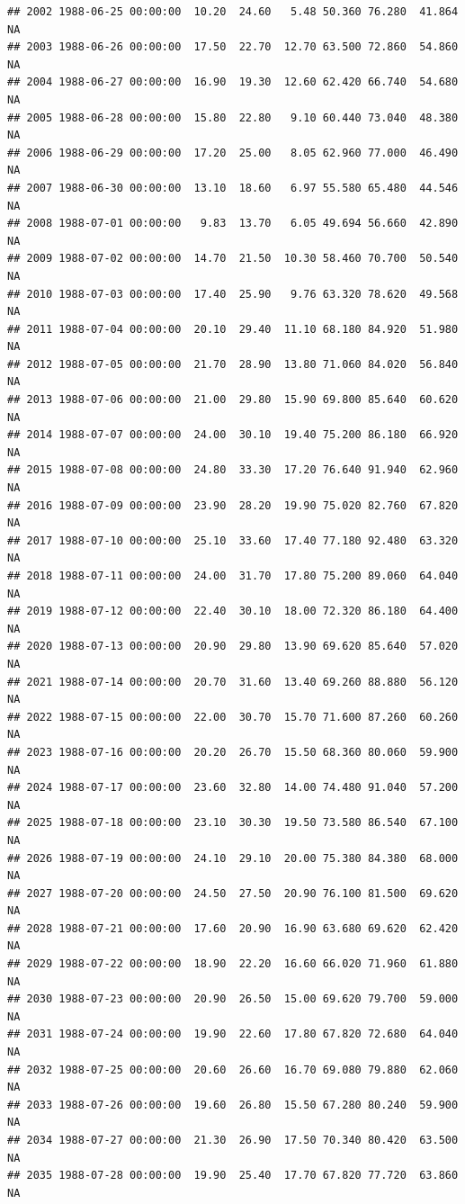 \documentclass{article}\usepackage{graphicx, color}
\makeatletter
\newenvironment{kframe}{%
 \def\at@end@of@kframe{}%
 \ifinner\ifhmode%
  \def\at@end@of@kframe{\end{minipage}}%
  \begin{minipage}{\columnwidth}%
 \fi\fi%
 \def\FrameCommand##1{\hskip\@totalleftmargin \hskip-\fboxsep
 \colorbox{shadecolor}{##1}\hskip-\fboxsep
     \hskip-\linewidth \hskip-\@totalleftmargin \hskip\columnwidth}%
 \MakeFramed {\advance\hsize-\width
   \@totalleftmargin\z@ \linewidth\hsize
   \@setminipage}}%
 {\par\unskip\endMakeFramed%
 \at@end@of@kframe}
\newenvironment{knitrout}{}{} %
\makeatother
\begin{document}
\begin{knitrout}
\begin{kframe}
\begin{verbatim}
## 2002 1988-06-25 00:00:00  10.20  24.60   5.48 50.360 76.280  41.864     NA
## 2003 1988-06-26 00:00:00  17.50  22.70  12.70 63.500 72.860  54.860     NA
## 2004 1988-06-27 00:00:00  16.90  19.30  12.60 62.420 66.740  54.680     NA
## 2005 1988-06-28 00:00:00  15.80  22.80   9.10 60.440 73.040  48.380     NA
## 2006 1988-06-29 00:00:00  17.20  25.00   8.05 62.960 77.000  46.490     NA
## 2007 1988-06-30 00:00:00  13.10  18.60   6.97 55.580 65.480  44.546     NA
## 2008 1988-07-01 00:00:00   9.83  13.70   6.05 49.694 56.660  42.890     NA
## 2009 1988-07-02 00:00:00  14.70  21.50  10.30 58.460 70.700  50.540     NA
## 2010 1988-07-03 00:00:00  17.40  25.90   9.76 63.320 78.620  49.568     NA
## 2011 1988-07-04 00:00:00  20.10  29.40  11.10 68.180 84.920  51.980     NA
## 2012 1988-07-05 00:00:00  21.70  28.90  13.80 71.060 84.020  56.840     NA
## 2013 1988-07-06 00:00:00  21.00  29.80  15.90 69.800 85.640  60.620     NA
## 2014 1988-07-07 00:00:00  24.00  30.10  19.40 75.200 86.180  66.920     NA
## 2015 1988-07-08 00:00:00  24.80  33.30  17.20 76.640 91.940  62.960     NA
## 2016 1988-07-09 00:00:00  23.90  28.20  19.90 75.020 82.760  67.820     NA
## 2017 1988-07-10 00:00:00  25.10  33.60  17.40 77.180 92.480  63.320     NA
## 2018 1988-07-11 00:00:00  24.00  31.70  17.80 75.200 89.060  64.040     NA
## 2019 1988-07-12 00:00:00  22.40  30.10  18.00 72.320 86.180  64.400     NA
## 2020 1988-07-13 00:00:00  20.90  29.80  13.90 69.620 85.640  57.020     NA
## 2021 1988-07-14 00:00:00  20.70  31.60  13.40 69.260 88.880  56.120     NA
## 2022 1988-07-15 00:00:00  22.00  30.70  15.70 71.600 87.260  60.260     NA
## 2023 1988-07-16 00:00:00  20.20  26.70  15.50 68.360 80.060  59.900     NA
## 2024 1988-07-17 00:00:00  23.60  32.80  14.00 74.480 91.040  57.200     NA
## 2025 1988-07-18 00:00:00  23.10  30.30  19.50 73.580 86.540  67.100     NA
## 2026 1988-07-19 00:00:00  24.10  29.10  20.00 75.380 84.380  68.000     NA
## 2027 1988-07-20 00:00:00  24.50  27.50  20.90 76.100 81.500  69.620     NA
## 2028 1988-07-21 00:00:00  17.60  20.90  16.90 63.680 69.620  62.420     NA
## 2029 1988-07-22 00:00:00  18.90  22.20  16.60 66.020 71.960  61.880     NA
## 2030 1988-07-23 00:00:00  20.90  26.50  15.00 69.620 79.700  59.000     NA
## 2031 1988-07-24 00:00:00  19.90  22.60  17.80 67.820 72.680  64.040     NA
## 2032 1988-07-25 00:00:00  20.60  26.60  16.70 69.080 79.880  62.060     NA
## 2033 1988-07-26 00:00:00  19.60  26.80  15.50 67.280 80.240  59.900     NA
## 2034 1988-07-27 00:00:00  21.30  26.90  17.50 70.340 80.420  63.500     NA
## 2035 1988-07-28 00:00:00  19.90  25.40  17.70 67.820 77.720  63.860     NA

\end{verbatim}
\end{kframe}
\end{knitrout}
\end{document}
